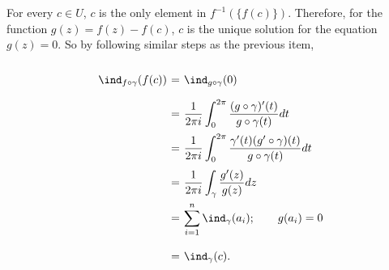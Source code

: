 For every $c \in U$, $c$ is the only element in $f^{-1}(\{f(c)\})$. Therefore, for the function $g(z) = f(z) - f(c)$, $c$ is the unique solution for the equation $g(z) = 0$. So by following similar steps as the previous item,
\[ \everymath{\displaystyle}
\arraycolsep=1.8pt\def\arraystretch{2.5}
\begin{array}{rcl}
    \ind_{f\circ\gamma}(f(c)) & = & \ind_{g\circ\gamma}(0)\\
    & = & \frac{1}{2\pi i} \int_{0}^{2\pi} \frac{(g\circ \gamma)'(t)}{g\circ \gamma(t)} dt\\
    & = & \frac{1}{2\pi i} \int_{0}^{2\pi} \frac{\gamma'(t)(g'\circ \gamma)(t)}{g\circ \gamma(t)} dt\\
    & = & \frac{1}{2\pi i} \int_{\gamma} \frac{g'(z)}{g(z)} dz\\
    & = & \sum_{i = 1}^{n} \ind_\gamma(a_i);\hspace{2em}  g(a_i) = 0\\
    & = & \ind_\gamma(c).
\end{array} \] 